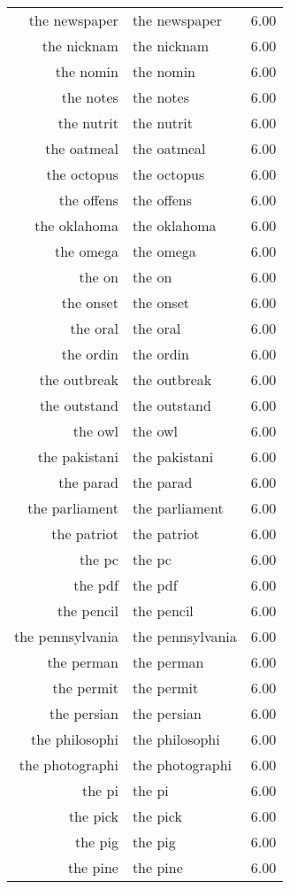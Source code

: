 \begin{table}[ht]
\begin{tabular}{rlr}
  the newspaper & the newspaper & 6.00 \\ 
  the nicknam & the nicknam & 6.00 \\ 
  the nomin & the nomin & 6.00 \\ 
  the notes & the notes & 6.00 \\ 
  the nutrit & the nutrit & 6.00 \\ 
  the oatmeal & the oatmeal & 6.00 \\ 
  the octopus & the octopus & 6.00 \\ 
  the offens & the offens & 6.00 \\ 
  the oklahoma & the oklahoma & 6.00 \\ 
  the omega & the omega & 6.00 \\ 
  the on & the on & 6.00 \\ 
  the onset & the onset & 6.00 \\ 
  the oral & the oral & 6.00 \\ 
  the ordin & the ordin & 6.00 \\ 
  the outbreak & the outbreak & 6.00 \\ 
  the outstand & the outstand & 6.00 \\ 
  the owl & the owl & 6.00 \\ 
  the pakistani & the pakistani & 6.00 \\ 
  the parad & the parad & 6.00 \\ 
  the parliament & the parliament & 6.00 \\ 
  the patriot & the patriot & 6.00 \\ 
  the pc & the pc & 6.00 \\ 
  the pdf & the pdf & 6.00 \\ 
  the pencil & the pencil & 6.00 \\ 
  the pennsylvania & the pennsylvania & 6.00 \\ 
  the perman & the perman & 6.00 \\ 
  the permit & the permit & 6.00 \\ 
  the persian & the persian & 6.00 \\ 
  the philosophi & the philosophi & 6.00 \\ 
  the photographi & the photographi & 6.00 \\ 
  the pi & the pi & 6.00 \\ 
  the pick & the pick & 6.00 \\ 
  the pig & the pig & 6.00 \\ 
  the pine & the pine & 6.00 \\ 

\end{tabular}
\end{table}
